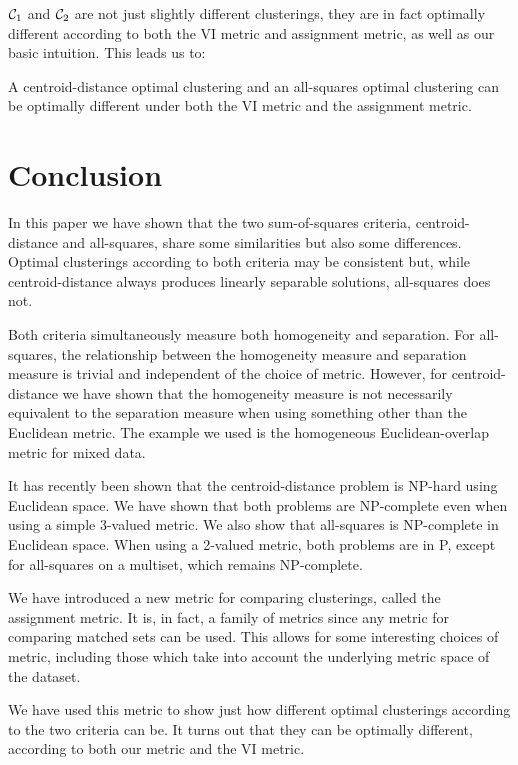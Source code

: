 $\mathcal{C}_1$ and $\mathcal{C}_2$ are not just slightly different clusterings, they are
in fact optimally different according to both the VI metric and assignment
metric, as well as our basic intuition.  This leads us to:
\begin{thm}
  A centroid-distance optimal clustering and an all-squares optimal clustering
  can be optimally different under both the VI metric and the assignment
  metric.
\end{thm}

\section{Conclusion}
\label{sec:conclusion}

In this paper we have shown that the two sum-of-squares criteria,
centroid-distance and all-squares, share some similarities but also some
differences.  Optimal clusterings according to both criteria may be
consistent but, while centroid-distance always produces linearly separable
solutions, all-squares does not.

Both criteria simultaneously measure both homogeneity and separation.  For
all-squares, the relationship between the homogeneity measure and separation
measure is trivial and independent of the choice of metric.  However, for
centroid-distance we have shown that the homogeneity measure is not
necessarily equivalent to the separation measure when using something other
than the Euclidean metric.  The example we used is the homogeneous
Euclidean-overlap metric for mixed data.

It has recently been shown that the centroid-distance problem is NP-hard using
Euclidean space.  We have shown that both problems are NP-complete even when
using a simple 3-valued metric.  We also show that all-squares is NP-complete
in Euclidean space.  When using a 2-valued metric, both problems are in P,
except for all-squares on a multiset, which remains NP-complete.

We have introduced a new metric for comparing clusterings, called the
assignment metric.  It is, in fact, a family of metrics since any metric for
comparing matched sets can be used.  This allows for some interesting choices
of metric, including those which take into account the underlying metric space
of the dataset.

We have used this metric to show just how different optimal clusterings
according to the two criteria can be.  It turns out that they can be optimally
different, according to both our metric and the VI metric.

